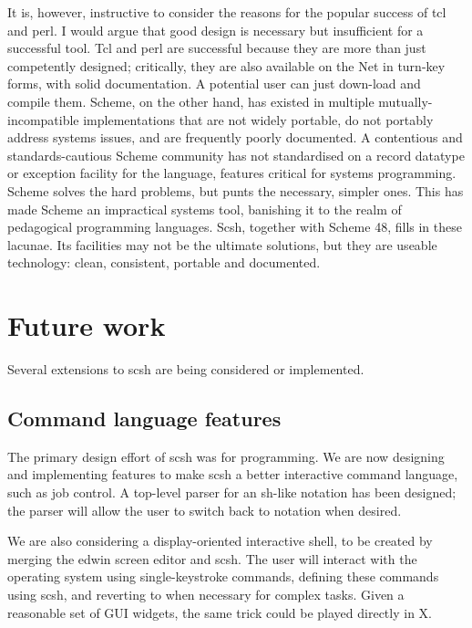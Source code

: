 It is, however, instructive to consider the reasons for the popular success of
tcl and perl.
I would argue that good design is necessary but insufficient for
a successful tool.
Tcl and perl are successful because they are more than just competently 
designed; 
critically, they are also available on the Net in turn-key forms, 
with solid documentation.
A potential user can just down-load and compile them.
Scheme, on the other hand, has existed in multiple mutually-incompatible
implementations that are not widely portable, do not portably address
systems issues, and are frequently poorly documented.
A contentious and standards-cautious Scheme community has not standardised
on a record datatype or exception facility for the language,
features critical for systems programming.
Scheme solves the hard problems, but punts the necessary, simpler ones.
This has made Scheme an impractical systems tool,
banishing it to the realm of pedagogical programming languages.
Scsh, together with Scheme 48, fills in these lacunae.
Its facilities may not be the ultimate solutions,
but they are useable technology: clean, consistent, portable and documented.

\section{Future work}
\label{sec:future-work}
Several extensions to scsh are being considered or implemented.
\subsection{Command language features}
The primary design effort of scsh was for programming.
We are now designing and implementing features to make scsh
a better interactive command language, such as job control.
A top-level parser for an sh-like notation has been designed;
the parser will allow the user to switch back to {\Scheme} notation
when desired.

We are also considering a display-oriented interactive shell, 
to be created by merging the edwin screen editor and scsh.
The user will interact with the operating system using single-keystroke
commands, defining these commands using scsh, and reverting to
{\Scheme} when necessary for complex tasks.
Given a reasonable set of GUI widgets, the same trick could be played
directly in X.

